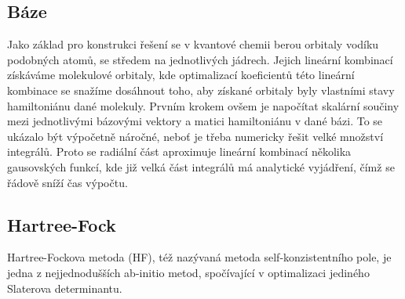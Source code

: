 \subsection{Báze}
Jako základ pro konstrukci řešení se v kvantové chemii berou orbitaly vodíku podobných atomů, se středem na jednotlivých jádrech. Jejich lineární kombinací získáváme molekulové orbitaly, kde optimalizací koeficientů této lineární kombinace se snažíme dosáhnout toho, aby získané orbitaly byly vlastními stavy hamiltoniánu dané molekuly.
Prvním krokem ovšem je napočítat skalární součiny mezi jednotlivými bázovými vektory a matici hamiltoniánu v dané bázi. To se ukázalo být výpočetně náročné, neboť je třeba numericky řešit velké množství integrálů. Proto se radiální část aproximuje lineární kombinací několika gausovských funkcí, kde již velká část integrálů má analytické vyjádření, čímž se řádově sníží čas výpočtu.
\subsection{Hartree-Fock}
Hartree-Fockova metoda (HF), též nazývaná metoda self-konzistentního pole, je jedna z nejjednodušších ab-initio metod, spočívající v optimalizaci jediného Slaterova determinantu. 
